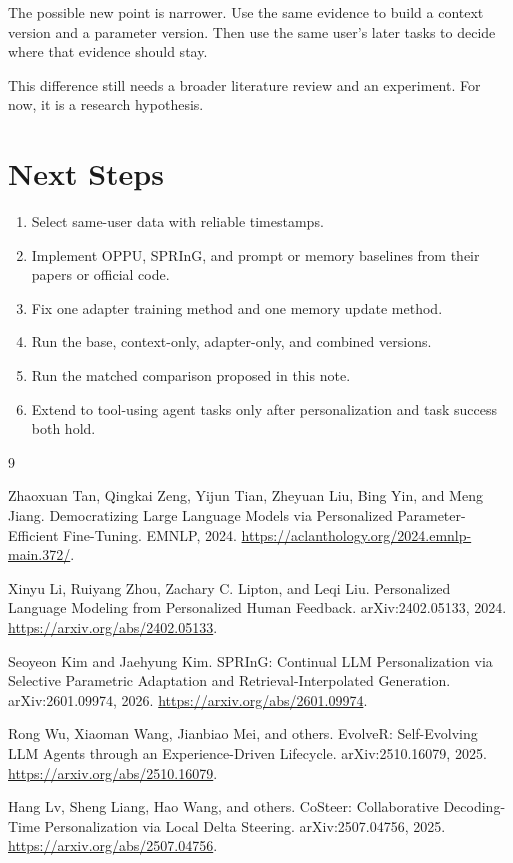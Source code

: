 \documentclass[11pt]{article}
\begin{document}
The possible new point is narrower. Use the same evidence to build a context
version and a parameter version. Then use the same user's later tasks to
decide where that evidence should stay.

This difference still needs a broader literature review and an experiment.
For now, it is a research hypothesis.

\section{Next Steps}

\begin{enumerate}
  \item Select same-user data with reliable timestamps.
  \item Implement OPPU, SPRInG, and prompt or memory baselines from their
  papers or official code.
  \item Fix one adapter training method and one memory update method.
  \item Run the base, context-only, adapter-only, and combined versions.
  \item Run the matched comparison proposed in this note.
  \item Extend to tool-using agent tasks only after personalization and task
  success both hold.
\end{enumerate}

\begin{thebibliography}{9}

Zhaoxuan Tan, Qingkai Zeng, Yijun Tian, Zheyuan Liu, Bing Yin, and Meng Jiang.
\newblock Democratizing Large Language Models via Personalized
Parameter-Efficient Fine-Tuning.
\newblock EMNLP, 2024.
\newblock \url{https://aclanthology.org/2024.emnlp-main.372/}.

Xinyu Li, Ruiyang Zhou, Zachary C. Lipton, and Leqi Liu.
\newblock Personalized Language Modeling from Personalized Human Feedback.
\newblock arXiv:2402.05133, 2024.
\newblock \url{https://arxiv.org/abs/2402.05133}.

Seoyeon Kim and Jaehyung Kim.
\newblock SPRInG: Continual LLM Personalization via Selective Parametric
Adaptation and Retrieval-Interpolated Generation.
\newblock arXiv:2601.09974, 2026.
\newblock \url{https://arxiv.org/abs/2601.09974}.

Rong Wu, Xiaoman Wang, Jianbiao Mei, and others.
\newblock EvolveR: Self-Evolving LLM Agents through an Experience-Driven
Lifecycle.
\newblock arXiv:2510.16079, 2025.
\newblock \url{https://arxiv.org/abs/2510.16079}.

Hang Lv, Sheng Liang, Hao Wang, and others.
\newblock CoSteer: Collaborative Decoding-Time Personalization via Local
Delta Steering.
\newblock arXiv:2507.04756, 2025.
\newblock \url{https://arxiv.org/abs/2507.04756}.

\end{thebibliography}
\end{document}
